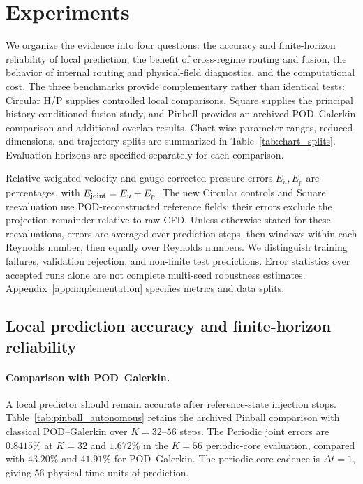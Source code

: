 \section{Experiments}
\label{sec:experiments}

We organize the evidence into four questions: the accuracy and
finite-horizon reliability of local prediction, the benefit of
cross-regime routing and fusion, the behavior of internal routing
and physical-field diagnostics, and the computational cost.
The three benchmarks provide complementary rather than identical
tests: Circular H/P supplies controlled local comparisons, Square
supplies the principal history-conditioned fusion study, and Pinball
provides an archived POD--Galerkin comparison and additional overlap
results. Chart-wise parameter ranges, reduced dimensions, and trajectory
splits are summarized in Table~\ref{tab:chart_splits}.
Evaluation horizons are specified separately for each comparison.

Relative weighted velocity and gauge-corrected pressure errors
$E_u,E_p$ are percentages, with $E_{\rm joint}=E_u+E_p$.
The new Circular controls and Square reevaluation use
POD-reconstructed reference fields; their errors exclude the
projection remainder relative to raw CFD.
Unless otherwise stated for these reevaluations, errors are averaged
over prediction steps, then windows within each Reynolds number,
then equally over Reynolds numbers.
We distinguish training failures, validation rejection, and
non-finite test predictions. Error statistics over accepted runs
alone are not complete multi-seed robustness estimates.
Appendix~\ref{app:implementation} specifies metrics and data splits.



\subsection{Local prediction accuracy and finite-horizon reliability}
\label{sec:exp_local}

\paragraph{Comparison with POD--Galerkin.}
A local predictor should remain accurate after reference-state
injection stops. Table~\ref{tab:pinball_autonomous} retains the
archived Pinball comparison with classical POD--Galerkin over
$K=32$--$56$ steps. The Periodic joint errors are $0.8415\%$
at $K=32$ and $1.672\%$ in the $K=56$ periodic-core evaluation,
compared with $43.20\%$ and $41.91\%$ for POD--Galerkin.
The periodic-core cadence is $\Delta t=1$, giving 56 physical
time units of prediction.

